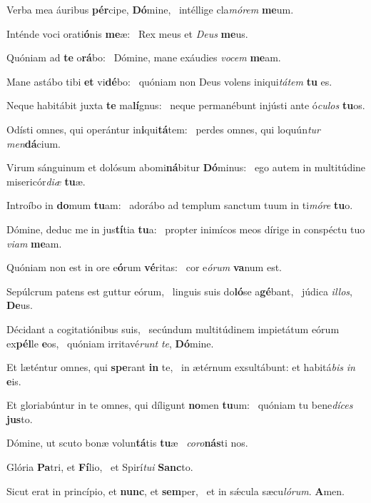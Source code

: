 \item Verba mea áuribus \textbf{pér}cipe, \textbf{Dó}mine,~\psstar{} intéllige cla\textit{mórem} \textbf{me}um.
\item Inténde voci orati\textbf{ó}nis \textbf{me}æ:~\psstar{} Rex meus et \textit{Deus} \textbf{me}us.
\item Quóniam ad \textbf{te} o\textbf{rá}bo:~\psstar{} Dómine, mane exáudies \textit{vocem} \textbf{me}am.
\item Mane astábo tibi \textbf{et} vi\textbf{dé}bo:~\psstar{} quóniam non Deus volens iniqui\textit{tátem} \textbf{tu} es.
\item Neque habitábit juxta \textbf{te} ma\textbf{lí}gnus:~\psstar{} neque permanébunt injústi ante ó\textit{culos} \textbf{tu}os.
\item Odísti omnes, qui operántur in\textbf{i}qui\textbf{tá}tem:~\psstar{} perdes omnes, qui loquún\textit{tur} \textit{men}\textbf{dá}cium.
\item Virum sánguinum et dolósum abomi\textbf{ná}bitur \textbf{Dó}minus:~\psstar{} ego autem in multitúdine misericór\textit{diæ} \textbf{tu}æ.
\item Introíbo in \textbf{do}mum \textbf{tu}am:~\psstar{} adorábo ad templum sanctum tuum in ti\textit{móre} \textbf{tu}o.
\item Dómine, deduc me in jus\textbf{tí}tia \textbf{tu}a:~\psstar{} propter inimícos meos dírige in conspéctu tuo \textit{viam} \textbf{me}am.
\item Quóniam non est in ore e\textbf{ó}rum \textbf{vé}ritas:~\psstar{} cor e\textit{órum} \textbf{va}num est.
\item Sepúlcrum patens est guttur eórum,~\pscross{} linguis suis do\textbf{ló}se a\textbf{gé}bant,~\psstar{} júdica \textit{illos}, \textbf{De}us.
\item Décidant a cogitatiónibus suis,~\pscross{} secúndum multitúdinem impietátum eórum ex\textbf{pél}le \textbf{e}os,~\psstar{} quóniam irritavé\textit{runt} \textit{te}, \textbf{Dó}mine.
\item Et læténtur omnes, qui \textbf{spe}rant \textbf{in} te,~\psstar{} in ætérnum exsultábunt: et habitá\textit{bis} \textit{in} \textbf{e}is.
\item Et gloriabúntur in te omnes, qui díligunt \textbf{no}men \textbf{tu}um:~\psstar{} quóniam tu bene\textit{díces} \textbf{jus}to.
\item Dómine, ut scuto bonæ volun\textbf{tá}tis \textbf{tu}æ~\psstar{} \textit{coro}\textbf{nás}ti nos.
\item Glória \textbf{Pa}tri, et \textbf{Fí}lio,~\psstar{} et Spirí\textit{tui} \textbf{Sanc}to.
\item Sicut erat in princípio, et \textbf{nunc}, et \textbf{sem}per,~\psstar{} et in sǽcula sæcu\textit{lórum}. \textbf{A}men.
